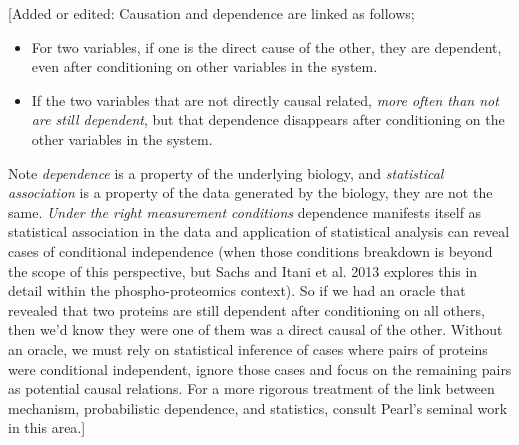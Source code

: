 \documentclass[journal=jacsat,manuscript=article]{achemso}
\def\added#1{{\color{magenta}[Added or edited: #1]}}
\begin{document}
\added{Causation and dependence are linked as follows;
\begin{itemize}
\item For two variables, if one is the direct cause of the other, they are dependent, even after conditioning on other variables in the system.
\item If the two variables that are not directly causal related, {\it more often than not are still dependent}, but that dependence disappears after conditioning on the other variables in the system.
\end{itemize}
Note {\it dependence} is a property of the underlying biology, and {\it statistical association} is a property of the data generated by the biology, they are not the same.  {\it Under the right measurement conditions} dependence manifests itself as statistical association in the data and application of statistical analysis can reveal cases of conditional independence (when those conditions breakdown is beyond the scope of this perspective, but Sachs and Itani et al. 2013 \cite{sachs2013single} explores this in detail within the phospho-proteomics context).  So if we had an oracle that revealed that two proteins are still dependent after conditioning on all others, then we'd know they were one of them was a direct causal of the other.  Without an oracle, we must rely on statistical inference of cases where pairs of proteins were conditional independent, ignore those cases and focus on the remaining pairs as potential causal relations.  For a more rigorous treatment of the link between mechanism, probabilistic dependence, and statistics, consult Pearl's seminal work in this area\cite{pearl2009causality}.}
\end{document}
